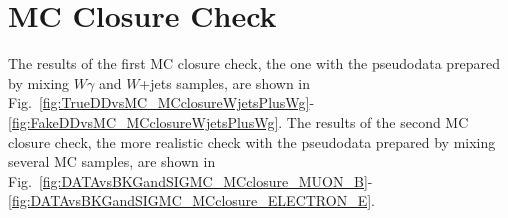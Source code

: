 \chapter{MC Closure Check}
\label{sec:MCclosureCheck}

The results of the first MC closure check, the one with the pseudodata prepared by mixing $W\gamma$ and $W$+jets samples, are shown in Fig.~\ref{fig:TrueDDvsMC_MCclosureWjetsPlusWg}-\ref{fig:FakeDDvsMC_MCclosureWjetsPlusWg}. The results of the second MC closure check, the more realistic check with the pseudodata prepared by mixing several MC samples, are shown in Fig.~\ref{fig:DATAvsBKGandSIGMC_MCclosure_MUON_B}-\ref{fig:DATAvsBKGandSIGMC_MCclosure_ELECTRON_E}.



